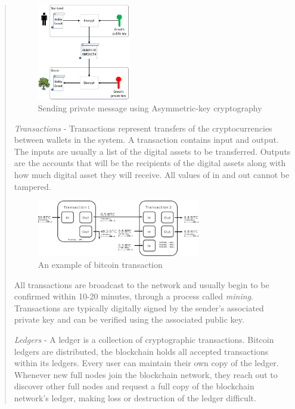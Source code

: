 \begin{itemize}
\begin{quote}
	\begin{figure}[h!]
		\centering
		\includegraphics[width=0.4\textwidth]{images/asymmetric_cryptography.png}
		\caption[An example of concept of Asymmetric-key cryptography]{Sending private message using Asymmetric-key cryptography}
		\label{fig:asymmetric_cryptography}
	\end{figure}
	\bigbreak

	\emph{Transactions} - Transactions represent transfers of the cryptocurrencies between wallets in the system. 
	A transaction contains input and output. The inputs are usually a list of the digital assets to be transferred.
	Outputs are	the accounts that will be the recipients of the digital assets along with how much digital asset they will receive.   
	All values of in and out cannot be tampered.

	\begin{figure}[h!]
		\centering
		\includegraphics[width=0.7\textwidth]{images/transaction.png}
		\caption[An example of bitcoin transaction]{An example of bitcoin transaction}
		\label{fig:transaction}
	\end{figure}
	\bigbreak

	All transactions are broadcast to the network and usually begin to be confirmed within 10-20 minutes, through a process called \emph{mining}.
	Transactions are typically digitally signed by the sender’s associated private key and can be verified using the associated public key.

	\bigbreak

	\emph{Ledgers} - 
	A ledger is a collection of cryptographic transactions. 
	Bitcoin ledgers are distributed, the blockchain holds all accepted transactions within its ledgers. Every user can maintain their own copy of the ledger.
	Whenever new full nodes join the blockchain network, they reach out to discover other full nodes and request a full copy of the blockchain network’s ledger, making loss or destruction of the ledger difficult.
	\bigbreak
	

\end{quote}
\end{itemize}

